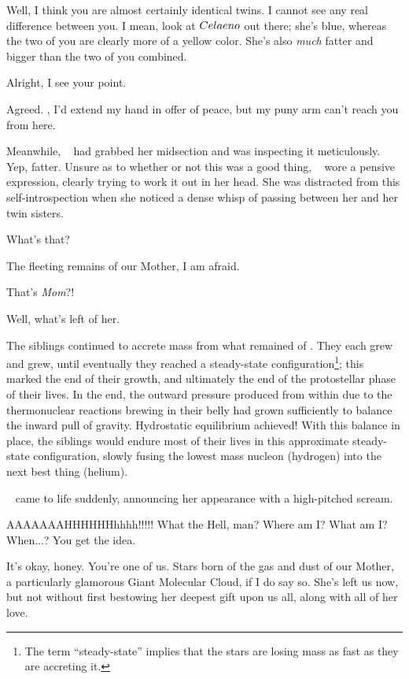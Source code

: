 \documentclass[main.tex]{subfiles}
\begin{document}
\newpara \Maia Well, I think you are almost certainly identical twins.  I cannot see any real difference between you.  I mean, look at $Celaeno$ out there; she's blue, whereas the two of you are clearly more of a yellow color.  She's also \textit{much} fatter and bigger than the two of you combined.  

\newpara \Celaeno Alright, I see your point.

\newpara \Taygete Agreed.  \rmalcyone, I'd extend my hand in offer of peace, but my puny arm can't reach you from here.

\newpara \nar Meanwhile, \rmcelaeno~ had grabbed her midsection and was inspecting it meticulously.  Yep, fatter.  Unsure as to whether or not this was a good thing, \rmcelaeno~ wore a pensive expression, clearly trying to work it out in her head.  She was distracted from this self-introspection when she noticed a dense whisp of \Pleione passing between her and her twin sisters.  

\newpara \Celaeno What's that?

\newpara \Maia The fleeting remains of our Mother, I am afraid.

\newpara \Electra That's \textit{Mom}?!

\newpara \Maia Well, what's left of her.

\newpara \nar The siblings continued to accrete mass from what remained of \rmpleione.  They each grew and grew, until eventually they reached a steady-state configuration\footnote{The term ``steady-state'' implies that the stars are losing mass as fast as they are accreting it.}; this marked the end of their growth, and ultimately the end of the protostellar phase of their lives.  In the end, the outward pressure produced from within due to the thermonuclear reactions brewing in their belly had grown sufficiently to balance the inward pull of gravity.  Hydrostatic equilibrium achieved!  With this balance in place, the siblings would endure most of their lives in this approximate steady-state configuration, slowly fusing the lowest mass nucleon (hydrogen) into the next best thing (helium).

\newpara \nar \rmsterope~ came to life suddenly, announcing her appearance with a high-pitched scream.

\newpara \Sterope AAAAAAAHHHHHHhhhh!!!!!  What the Hell, man?  Where am I?  What am I?  When...?  You get the idea.

\newpara \Maia It's okay, honey.  You're one of us.  Stars born of the gas and dust of our Mother, a particularly glamorous Giant Molecular Cloud, if I do say so.  She's left us now, but not without first bestowing her deepest gift upon us all, along with all of her love.
\end{document}

